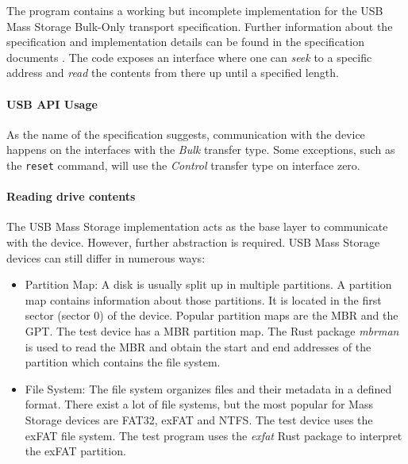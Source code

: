The program contains a working but incomplete implementation for the \acrshort{USB} Mass Storage Bulk-Only transport specification. Further information about the specification and implementation details can be found in the specification documents \cite{usb_specification_boot} \cite{usb_specification_bulk}. The code exposes an interface where one can \textit{seek} to a specific address and \textit{read} the contents from there up until a specified length.

\paragraph{\acrshort{USB} \acrshort{API} Usage}
As the name of the specification suggests, communication with the device happens on the interfaces with the \textit{Bulk} transfer type. Some exceptions, such as the \texttt{reset} command, will use the \textit{Control} transfer type on interface zero.

\paragraph{Reading drive contents}
The \acrshort{USB} Mass Storage implementation acts as the base layer to communicate with the device. However, further abstraction is required. USB Mass Storage devices can still differ in numerous ways:

\begin{itemize}
\item Partition Map: A disk is usually split up in multiple partitions. A partition map contains information about those partitions. It is located in the first sector (sector 0) of the device. Popular partition maps are the \acrfull{MBR} and the \acrfull{GPT}. The test device has a \acrfull{MBR} partition map. The Rust package \textit{mbrman} \cite{mbrman} is used to read the \acrshort{MBR} and obtain the start and end addresses of the partition which contains the file system.

\item File System: The file system organizes files and their metadata in a defined format. There exist a lot of file systems, but the most popular for Mass Storage devices are \acrfull{FAT32}, \acrfull{exFAT} and \acrfull{NTFS}. The test device uses the \acrshort{exFAT} file system. The test program uses the \textit{exfat} \cite{exfat_package} Rust package to interpret the \acrshort{exFAT} partition.
\end{itemize}

